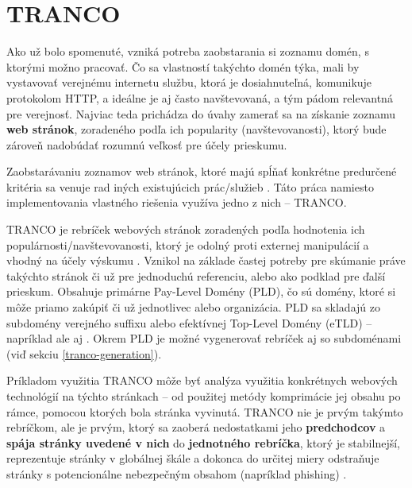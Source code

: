 

\section{TRANCO}
\label{tranco}

Ako už bolo spomenuté, vzniká potreba zaobstarania si zoznamu domén, s ktorými možno pracovať. Čo sa vlastností takýchto domén týka,
mali by vystavovať verejnému internetu službu, ktorá je dosiahnuteľná, komunikuje protokolom HTTP, a ideálne je aj často navštevovaná,
a tým pádom relevantná pre verejnosť. Najviac teda prichádza do úvahy zamerať sa na získanie zoznamu \textbf{web stránok}, zoradeného podľa
ich popularity (navštevovanosti), ktorý bude zároveň nadobúdať rozumnú veľkosť pre účely prieskumu. 

Zaobstarávaniu zoznamov web stránok, ktoré majú spĺňať konkrétne predurčené kritéria sa venuje rad iných existujúcich prác/služieb 
\cite{hacker-target-website-lists-overview, tranco}. Táto práca namiesto implementovania vlastného riešenia využíva jedno z nich -- TRANCO.

TRANCO je rebríček webových stránok zoradených podľa hodnotenia ich populárnosti/navštevovanosti, ktorý je odolný proti externej manipulácií a vhodný na účely výskumu \cite{tranco-homepage}. 
Vznikol na základe častej potreby pre skúmanie práve takýchto stránok či už pre jednoduchú referenciu, alebo ako podklad pre ďalší prieskum.
Obsahuje primárne Pay-Level Domény (PLD), čo sú domény, ktoré si môže priamo zakúpiť či už jednotlivec alebo organizácia. PLD sa skladajú zo subdomény verejného 
suffixu
alebo efektívnej Top-Level Domény (eTLD) -- napríklad  ale aj  \cite{tranco}. Okrem PLD je možné vygenerovať rebríček aj so subdoménami (viď sekciu
\ref{tranco-generation}).

Príkladom využitia TRANCO môže byť analýza využitia konkrétnych webových technológií na týchto stránkach -- od použitej metódy komprimácie jej obsahu po rámce, pomocou ktorých bola 
stránka vyvinutá. 
TRANCO nie je prvým takýmto rebríčkom, ale je prvým, ktorý sa zaoberá nedostatkami jeho \textbf{predchodcov} a \textbf{spája stránky uvedené v nich} do \textbf{jednotného rebríčka}, 
ktorý je stabilnejší, reprezentuje stránky v globálnej škále a dokonca do určitej miery odstraňuje stránky s potencionálne nebezpečným obsahom (napríklad phishing) \cite{tranco}. 

